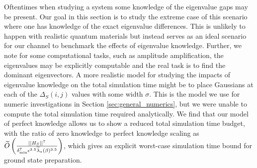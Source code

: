 Oftentimes when studying a system some knowledge of the eigenvalue gaps may be present. Our goal in this section is to study the extreme case of this scenario where one has knowledge of the exact eigenvalue differences. This is unlikely to happen with realistic quantum materials but instead serves as an ideal scenario for our channel to benchmark the effects of eigenvalue knowledge. Further, we note for some computational tasks, such as amplitude amplification, the eigenvalues may be explicitly computable and the real task is to find the dominant eigenvectors. A more realistic model for studying the impacts of eigenvalue knowledge on the total simulation time might be to place Gaussians at each of the $\Delta_S(i,j)$ values with some width $\sigma$. This is the model we use for numeric investigations in Section \ref{sec:general_numerics}, but we were unable to compute the total simulation time required analytically. We find that our model of perfect knowledge allows us to show a reduced total simulation time budget, with the ratio of zero knowledge to perfect knowledge scaling as $\widetilde{O} \left( \frac{\left| \left| H_S \right| \right|^7}{\delta_{\min}^7 \epsilon^{3.5} \widetilde{\lambda}_\star(\beta)^{3.5}} \right)$, 
     which gives an explicit worst-case simulation time bound for ground state preparation.




